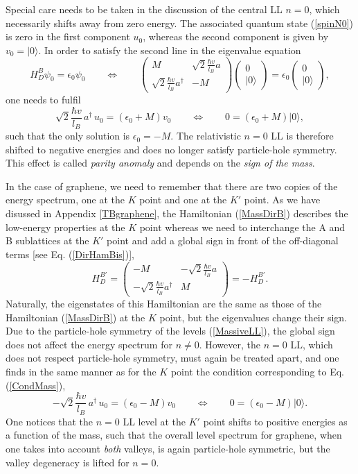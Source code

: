 \documentclass[10pt]{book}
\newcommand{\beq}{\begin{equation}}
\newcommand{\eeq}{\end{equation}}
\begin{document}
Special care needs to be taken in the discussion of the central LL $n=0$, which necessarily shifts away from zero energy.
The associated quantum state (\ref{spinN0}) is zero in the first component $u_0$, whereas the second component is 
given by $v_0=|0\rangle$. In order to satisfy the second line in the eigenvalue equation 
$$
H_D^B \psi_0 = \epsilon_0 \psi_0 \qquad {\Leftrightarrow} \qquad
\left(\begin{array}{cc}
M & \sqrt{2}\frac{\hbar v}{l_B} a \\ \sqrt{2}\frac{\hbar v}{l_B} a^{\dagger} & -M
        \end{array}\right)\left(\begin{array}{c} 0 \\ |0\rangle \end{array}\right) 
= \epsilon _0 \left(\begin{array}{c} 0 \\ |0\rangle \end{array}\right) ,
$$
one needs to fulfil 
\beq\label{CondMass}
\sqrt{2}\frac{\hbar v}{l_B}\, a^{\dagger}\, u_0 = (\epsilon_0 + M) v_0 \qquad \Leftrightarrow \qquad
0=(\epsilon_0 + M)|0\rangle,
\eeq
such that the only solution is $\epsilon_0 = -M$. The relativistic $n=0$ LL is therefore shifted to negative energies
and does no longer satisfy particle-hole symmetry. This effect is called {\sl parity anomaly} and depends
on the {\sl sign of the mass}. 

In the case of graphene, we need to remember that there are two copies of the energy spectrum, one at the $K$ point
and one at the $K'$ point. As we have disussed in Appendix \ref{TBgraphene}, the Hamiltonian (\ref{MassDirB}) describes
the low-energy properties at the $K$ point whereas we need to interchange the A and B sublattices at the $K'$ point and add
a global sign in front of the off-diagonal terms [see Eq. (\ref{DirHamBis})],
\beq\label{MassDirBp}
H_D^{B\prime}=   \left(\begin{array}{cc}
- M & - \sqrt{2}\frac{\hbar v}{l_B} a \\ -\sqrt{2}\frac{\hbar v}{l_B} a^{\dagger} & M
        \end{array}\right) = -H_D^{B\prime}.
\eeq
Naturally, the eigenstates of this Hamiltonian are the same as those of the Hamiltonian (\ref{MassDirB}) at the 
$K$ point, but the eigenvalues change their sign. Due to the particle-hole symmetry of the levels (\ref{MassiveLL}),
the global sign does not affect the energy spectrum for $n\neq 0$. However, the $n=0$ LL, which
does not respect particle-hole symmetry, must again be treated apart, and one finds in the same manner as for the $K$ point
the condition corresponding to Eq. (\ref{CondMass}),
\beq\label{CondMassbis}
-\sqrt{2}\frac{\hbar v}{l_B}\, a^{\dagger}\, u_0 = (\epsilon_0 - M) v_0 \qquad \Leftrightarrow \qquad
0=(\epsilon_0 - M)|0\rangle.
\eeq
One notices that the $n=0$ LL level at the $K'$ point shifts to positive energies as a function of the mass, such that 
the overall level spectrum for graphene, when one takes into account {\sl both} valleys, 
is again particle-hole symmetric, but the valley degeneracy is lifted for
$n=0$.
\end{document}
